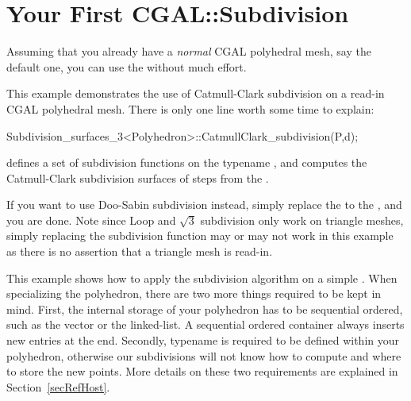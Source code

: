 


\section{Your First CGAL::Subdivision}
\label{secFirstSub}
Assuming that you already have a \emph{normal} CGAL polyhedral mesh,
say the default one, you can use the 
without much effort.


This example demonstrates the use of Catmull-Clark subdivision
on a read-in CGAL polyhedral mesh. There is only one line worth some
time to explain:
\begin{ccExampleCode}
Subdivision_surfaces_3<Polyhedron>::CatmullClark_subdivision(P,d);
\end{ccExampleCode}
 defines a set of subdivision 
functions on the typename , and 
 computes the 
Catmull-Clark subdivision surfaces of  steps from the 
.

If you want to use Doo-Sabin subdivision instead, simply replace the 
 to the , 
and you are done. Note since Loop and $\sqrt{3}$ subdivision only work on 
triangle meshes, simply replacing the subdivision function may or 
may not work in this example as there is no assertion that a triangle 
mesh is read-in.

This example shows how to apply the subdivision algorithm 
on a simple . When specializing the polyhedron,
there are two more things required to be kept in mind.  
First, the internal storage of your 
polyhedron has to be sequential ordered, such as the vector 
or the linked-list. A sequential ordered container always inserts new 
entries at the end. Secondly, typename  is 
required to be defined within your polyhedron, otherwise our
subdivisions will not know how to compute and where to store the
new points. More details on these two requirements are explained
in Section~\ref{secRefHost}.

